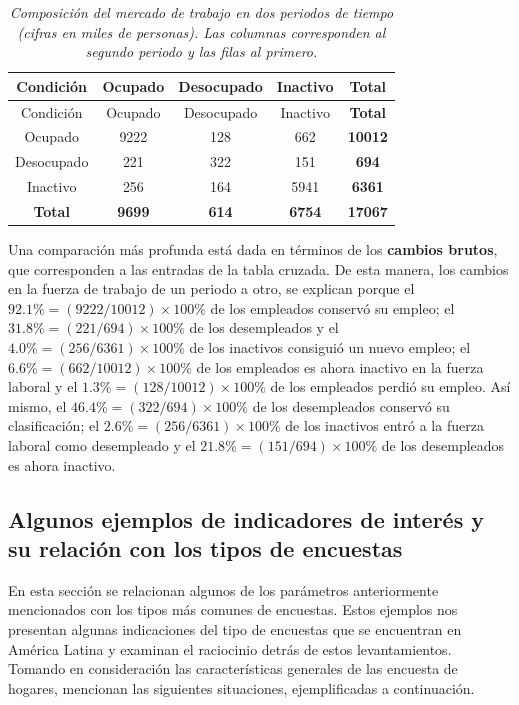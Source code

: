 \documentclass[
  12pt,
  spanish,
]{book}
\begin{document}
\begin{longtable}[]{@{}ccccc@{}}
\caption{\emph{Composición del mercado de trabajo en dos periodos de tiempo (cifras en miles de personas). Las columnas corresponden al segundo periodo y las filas al primero.}}\tabularnewline
\toprule
Condición & Ocupado & Desocupado & Inactivo & \textbf{Total} \\
\midrule
\endfirsthead
\toprule
Condición & Ocupado & Desocupado & Inactivo & \textbf{Total} \\
\midrule
\endhead
Ocupado & 9222 & 128 & 662 & \textbf{10012} \\
Desocupado & 221 & 322 & 151 & \textbf{694} \\
Inactivo & 256 & 164 & 5941 & \textbf{6361} \\
\textbf{Total} & \textbf{9699} & \textbf{614} & \textbf{6754} & \textbf{17067} \\
\bottomrule
\end{longtable}

Una comparación más profunda está dada en términos de los \textbf{cambios brutos}, que corresponden a las entradas de la tabla cruzada. De esta manera, los cambios en la fuerza de trabajo de un periodo a otro, se explican porque el \(92.1 \%=(9222/10012) \times 100 \%\) de los empleados conservó su empleo; el \(31.8\% = (221 / 694 )\times 100 \%\) de los desempleados y el \(4.0 \% = (256/6361)\times 100 \%\) de los inactivos consiguió un nuevo empleo; el \(6.6\% = (662/10012)\times 100 \%\) de los empleados es ahora inactivo en la fuerza laboral y el \(1.3\% = (128/10012)\times 100 \%\) de los empleados perdió su empleo. Así mismo, el \(46.4\% = (322/694)\times 100 \%\) de los desempleados conservó su clasificación; el \(2.6\% = (256 / 6361)\times 100 \%\) de los inactivos entró a la fuerza laboral como desempleado y el \(21.8\% = (151 / 694)\times 100 \%\) de los desempleados es ahora inactivo.

\hypertarget{algunos-ejemplos-de-indicadores-de-interuxe9s-y-su-relaciuxf3n-con-los-tipos-de-encuestas}{%
\subsection{Algunos ejemplos de indicadores de interés y su relación con los tipos de encuestas}\label{algunos-ejemplos-de-indicadores-de-interuxe9s-y-su-relaciuxf3n-con-los-tipos-de-encuestas}}

En esta sección se relacionan algunos de los parámetros anteriormente mencionados con los tipos más comunes de encuestas. Estos ejemplos nos presentan algunas indicaciones del tipo de encuestas que se encuentran en América Latina y examinan el raciocinio detrás de estos levantamientos. Tomando en consideración las características generales de las encuesta de hogares, \citet{Duncan_Kalton_1987} mencionan las siguientes situaciones, ejemplificadas a continuación.
\end{document}
